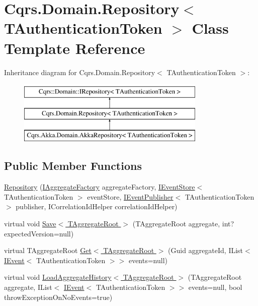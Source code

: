 \hypertarget{classCqrs_1_1Domain_1_1Repository}{}\section{Cqrs.\+Domain.\+Repository$<$ T\+Authentication\+Token $>$ Class Template Reference}
\label{classCqrs_1_1Domain_1_1Repository}
Inheritance diagram for Cqrs.\+Domain.\+Repository$<$ T\+Authentication\+Token $>$\+:\begin{figure}[H]
\begin{center}
\leavevmode
\includegraphics[height=3.000000cm]{classCqrs_1_1Domain_1_1Repository}
\end{center}
\end{figure}
\subsection*{Public Member Functions}
\begin{DoxyCompactItemize}
\item 
\hyperlink{classCqrs_1_1Domain_1_1Repository_ab513757cb27ab3f34a1cd4d5396aa0c1}{Repository} (\hyperlink{interfaceCqrs_1_1Domain_1_1Factories_1_1IAggregateFactory}{I\+Aggregate\+Factory} aggregate\+Factory, \hyperlink{interfaceCqrs_1_1Events_1_1IEventStore}{I\+Event\+Store}$<$ T\+Authentication\+Token $>$ event\+Store, \hyperlink{interfaceCqrs_1_1Events_1_1IEventPublisher}{I\+Event\+Publisher}$<$ T\+Authentication\+Token $>$ publisher, I\+Correlation\+Id\+Helper correlation\+Id\+Helper)
\item 
virtual void \hyperlink{classCqrs_1_1Domain_1_1Repository_a7795a0bd435022c686306fbc76311694}{Save$<$ T\+Aggregate\+Root $>$} (T\+Aggregate\+Root aggregate, int? expected\+Version=null)
\item 
virtual T\+Aggregate\+Root \hyperlink{classCqrs_1_1Domain_1_1Repository_ac83c06d643620a087232f5425d7ab1e3}{Get$<$ T\+Aggregate\+Root $>$} (Guid aggregate\+Id, I\+List$<$ \hyperlink{interfaceCqrs_1_1Events_1_1IEvent}{I\+Event}$<$ T\+Authentication\+Token $>$$>$ events=null)
\item 
virtual void \hyperlink{classCqrs_1_1Domain_1_1Repository_ac634b50cbacdc3ab209f61c042cc6fab}{Load\+Aggregate\+History$<$ T\+Aggregate\+Root $>$} (T\+Aggregate\+Root aggregate, I\+List$<$ \hyperlink{interfaceCqrs_1_1Events_1_1IEvent}{I\+Event}$<$ T\+Authentication\+Token $>$$>$ events=null, bool throw\+Exception\+On\+No\+Events=true)
\end{DoxyCompactItemize}
